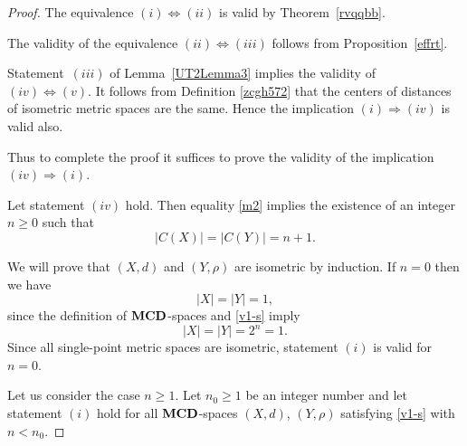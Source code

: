 \documentclass[10pt,a4paper]{amsart}
\begin{document}
\begin{proof} The equivalence 
$(i)\iff (ii)$ is valid by Theorem~\ref{rvqqbb}.

The validity of the equivalence $(ii) \iff (iii)$ follows from Proposition~\ref{effrt}.

Statement~$(iii)$ of Lemma~\ref{UT2Lemma3} implies the validity of 
\(
(iv)\iff(v).
\)
 It follows from Definition \ref{zcgh572} that the centers of distances
of isometric metric spaces are the same. Hence the implication
$(i) \Rightarrow (iv)$ is valid also. 

Thus to complete the proof  it suffices
to prove the validity of the implication
$(iv) \Rightarrow (i).$


Let statement $(iv)$ hold.
Then equality \eqref{m2} implies the existence of an integer $n \ge 0$ such that
\begin{equation}
    \label{v1-s}
|C(X)| = |C(Y)| = n+1. 
\end{equation}



We will prove that $(X,d)$ and $(Y,\rho)$ are isometric by induction.
If $n=0$ then we have 
\begin{equation*}
|X| = |Y| = 1,
\end{equation*}
since the definition of ${\bf MCD}$-spaces and \eqref{v1-s} imply 
\begin{equation*}
|X| = |Y| = 2^n=1.
\end{equation*}
Since all
single-point metric spaces are isometric, statement $(i)$ is valid for  $n=0.$


Let us consider the case $n\geq 1$. Let $n_0 \geq 1$ be an integer number and let statement $(i)$ hold for all ${\bf MCD}$-spaces $(X,d)$, $(Y,\rho)$ satisfying \eqref{v1-s} with $n<n_0$. 


\end{proof}
\end{document}
